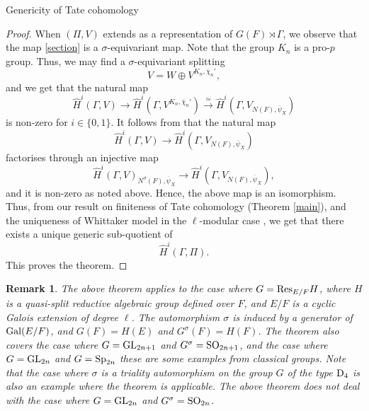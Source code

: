 \documentclass[10pt, reqno]{amsart}
\theoremstyle{plain}
\numberwithin{equation}{section}
\newtheorem{remark}[theorem]{Remark}
\begin{document}
\begin{section}{Genericity of Tate cohomology}
\begin{proof}
When $(\Pi,V)$ extends as a
representation of $G(F)\rtimes \Gamma$, we observe that the map 
\eqref{section} is a $\sigma$-equivariant map. Note that the 
group $K_n$ is a pro-$p$ group. Thus, we may find a $\sigma$-equivariant
splitting 
$$V=W\oplus V^{K_n, \overline{\chi}_n'},$$
and we get that the natural map 
$$\widehat{H}^i(\Gamma, V)\rightarrow 
\widehat{H}^i(\Gamma, V^{K_n, \overline{\chi}_n'})\xrightarrow{\simeq}
\widehat{H}^i(\Gamma, V_{N(F), \overline{\psi}_X})$$ is non-zero for
$i\in \{0,1\}$.  It follows from \cite[Theorem
3.3.2]{dhar2025jacquetmodulestatecohomology} that the natural map
$$\widehat{H}^i(\Gamma, V)\rightarrow \widehat{H}^i
(\Gamma, V_{N(F), \overline{\psi}_X})$$
factorises through an injective map 
$$\widehat{H}^i(\Gamma, V)_{N^\sigma(F), \overline{\psi}_X}
\rightarrow \widehat{H}^i(\Gamma, V_{N(F), \overline{\psi}_X}),$$
and it is non-zero as noted above. Hence,
the above map is an isomorphism. 
Thus, from our result on 
finiteness of Tate cohomology (Theorem \ref{main}), 
and the uniqueness of Whittaker model in the 
$\ell$-modular case 
\cite[Corollary 7.2]{nadir_whit_model}, we get that 
there exists a unique generic sub-quotient of 
$$\widehat{H}^i(\Gamma, \Pi).$$
This proves the theorem. 
\end{proof}
\begin{remark}\normalfont
The above theorem applies to the case where $G={\rm Res}_{E/F}H$,
where $H$ is a quasi-split reductive algebraic group defined over $F$, 
and $E/F$ is a cyclic Galois extension of degree $\ell$. The 
automorphism $\sigma$ is induced by a generator of ${\rm Gal}(E/F)$, and 
$G(F)=H(E)$ and $G^\sigma(F)=H(F)$. The theorem also covers the
case where $G={\rm GL}_{2n+1}$
and $G^\sigma={\rm SO}_{2n+1}$, and the case where $G={\rm GL}_{2n}$ and 
$G={\rm Sp}_{2n}$ these are some examples from classical groups.
Note that the case where $\sigma$ is a triality automorphism on the 
group $G$ of the type ${\rm D}_4$ is also an example where the theorem is 
applicable. The above theorem does not deal with the case where 
$G={\rm GL}_{2n}$ and $G^\sigma={\rm SO}_{2n}$.
\end{remark}











































    
\end{section}
\end{document}
